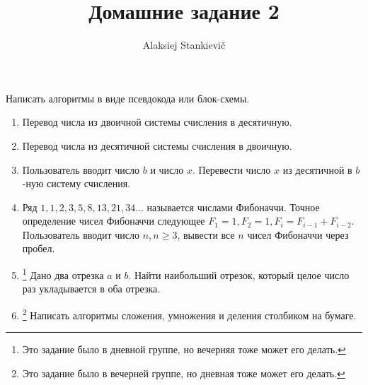 \documentclass[12pt]{article}
\author{Alaksiej Stankievič}
\title{Домашние задание 2}
\begin{document}
 Написать алгоритмы в виде псевдокода или блок-схемы.
 \begin{enumerate}
  \item Перевод числа из двоичной системы счисления в десятичную.
  \item Перевод числа из десятичной системы счисления в двоичную.
  \item Пользователь вводит число $b$ и число $x$. Перевести число $x$ из десятичной в $b$-ную систему счисления. 
  \item Ряд $1, 1, 2, 3, 5, 8, 13, 21, 34...$ называется числами Фибоначчи. Точное определение чисел Фибоначчи следующее $F_1 =1, F_2=1, F_i=F_{i-1}+F_{i-2}$. Пользователь вводит число $n, n\geq3$, вывести все $n$ чисел Фибоначчи через пробел.
  \item\footnote{Это задание было в дневной группе, но вечерняя тоже может его делать.} Дано два отрезка $a$ и $b$. Найти наибольший отрезок, который целое число раз укладывается в оба отрезка.
  \item\footnote{Это задание было в вечерней группе, но дневная тоже может его делать.} Написать алгоритмы сложения, умножения и деления столбиком на бумаге.
 \end{enumerate}
\end{document}
